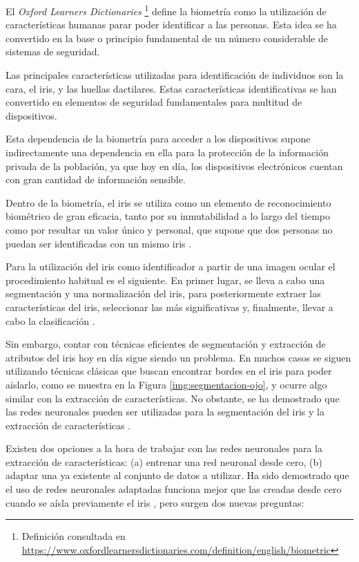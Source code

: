  \label{capitulo1}

El \textit{Oxford Learners Dictionaries} \footnote{Definición consultada en \url{https://www.oxfordlearnersdictionaries.com/definition/english/biometric}} define la biometría como la utilización de características humanas parar poder identificar a las personas. Esta idea se ha convertido en la base o principio fundamental de un número considerable de sistemas de seguridad.

Las principales características utilizadas para identificación de individuos son la cara, el iris, y las huellas dactilares. Estas características identificativas se han convertido en elementos de seguridad fundamentales para multitud de dispositivos. 

Esta dependencia de la biometría para acceder a los dispositivos supone indirectamente una dependencia en ella para la protección de la información privada de la población, ya que hoy en día, los dispositivos electrónicos cuentan con gran cantidad de información sensible.

Dentro de la biometría, el iris se utiliza como un elemento de reconocimiento biométrico de gran eficacia, tanto por su inmutabilidad a lo largo del tiempo como por resultar un valor único y 
personal, que supone que dos personas no puedan ser identificadas con un mismo iris \cite{malgheet_iris_2021}.

Para la utilización del iris como identificador a partir de una imagen ocular el procedimiento habitual es el siguiente. En primer lugar, se lleva a cabo una segmentación y una normalización del iris, para posteriormente extraer las características del iris, seleccionar las más significativas y, finalmente, llevar a cabo la clasificación \cite{malgheet_iris_2021}.

Sin embargo, contar con técnicas eficientes de segmentación y extracción de atributos del iris hoy en día sigue siendo un problema. En muchos casos se siguen utilizando técnicas clásicas que buscan encontrar bordes en el iris para poder aislarlo, como se muestra en la Figura \ref{img:segmentacion-ojo}, y ocurre algo similar con la extracción de características.
No obstante, se ha demostrado que las redes neuronales pueden ser utilizadas para la segmentación del iris \cite{lozej_end--end_2018} y la extracción de características \cite{tfg_iris_2020}\cite{boyd_deep_2020}.

Existen dos opciones a la hora de trabajar con las redes neuronales para la extracción de características: (a) entrenar una red neuronal desde cero, (b) adaptar una ya existente al conjunto de datos a utilizar. Ha sido demostrado que el uso de redes neuronales adaptadas funciona mejor que las creadas desde cero cuando se aísla previamente el iris \cite{boyd_deep_2020}, pero surgen dos nuevas preguntas:

